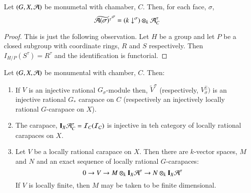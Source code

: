 \begin{lem}\label{art6-lemma-14.7}
Let $(G, X, \mathcal{A})$ be monumetal with chamaber, $C$. Then, for each face, $\sigma$,
$$
\widetilde{\mathcal{A}(\sigma)^{\tau}}^{\sigma} = (k \downarrow^{\sigma})\otimes_{k} \mathcal{A}_{C}^{\tau}
$$ 
\end{lem}

\begin{proof}
This is just the following observation. Let $H$ be a group and let $P$ be a closed subgroup with coordinate rings, $R$ and $S$ respectively. Then $I_{H/P}(S^{\tau}) = R^{\tau}$ and the identification is functorial.
\end{proof}

\begin{theorem}\label{art6-thm-14.8}
Let $(G, X, \mathcal{A})$ be monumental with chamber, $C$. Then:
\begin{enumerate}[(1)]
\item If $V$ is an injective rational $G_{\sigma}$-module then, $\widetilde{V}^{\sigma}$ (respectively, $V_{\sigma}^{||})$ is an injective rational  $G_{*}$ carapace on $C$ (respectively an injectively locally rational $G$-carapace on $X$).\label{art6-thm14.8-enum-1}

\item The carapace, $\mathbf{I}_{X}\mathcal{A}_{C}^{\tau} = \mathcal{I}_{C}(\mathcal{I} \cal_{C})$ is injective in teh category of locally rational carapaces on $X$.\label{art6-thm14.8-enum-2}

\item  Let $V$ be a locally rational carapace on $X$. Then there are $k$-vector spaces, $M$ and $N$ and an exact sequence of locally rational $G$-carapaces:\label{art6-thm14.8-enum-3}
$$
0 \rightarrow V \rightarrow M \otimes_{k}\mathbf{I}_{X}\mathcal{A}^{\tau} \rightarrow N \otimes_{k}\mathbf{I}_{X}\mathcal{A}^{\tau}
$$
If $V$ is locally finite, then $M$ may be taken to be finite dimensional.
\end{enumerate}
\end{theorem}

